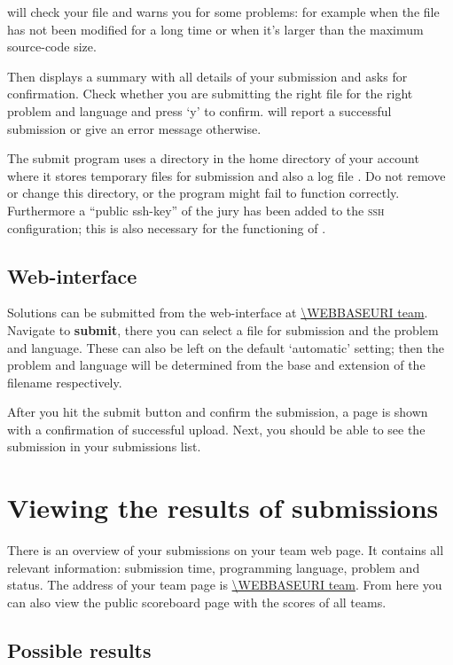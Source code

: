  will check your file and warns you for some problems:
for example when the file has not been modified for a long time or
when it's larger than the maximum source-code size.

Then  displays a summary with all details of your
submission and asks for confirmation. Check whether you are submitting
the right file for the right problem and language and press `y' to
confirm.  will report a successful submission or give
an error message otherwise.

The submit program uses a directory \cmd{\USERSUBMITDIR} in the
home directory of your account where it stores temporary files for
submission and also a log file . Do not remove or
change this directory, or the  program might fail to
function correctly. Furthermore a ``public ssh-key'' of the jury has
been added to the \textsc{ssh} configuration; this is also necessary
for the functioning of .

\subsection{Web-interface}

Solutions can be submitted from the web-interface at \url{\WEBBASEURI team}.
Navigate to \textbf{submit}, there you can select a file for
submission and the problem and language. These can also be left on the
default `automatic' setting; then the problem and language will be
determined from the base and extension of the filename respectively.

After you hit the submit button and confirm the submission, a page is
shown with a confirmation of successful upload. Next, you should be
able to see the submission in your submissions list.

\section{Viewing the results of submissions}

There is an overview of your submissions on your team web page.
It contains all relevant information: submission time, programming
language, problem and status. The address of your team page is
\url{\WEBBASEURI team}. From here you can also view the public
scoreboard page with the scores of all teams.

\subsection{Possible results}

